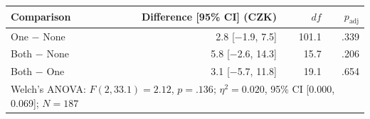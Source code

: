 \begin{tabular}{lrrr}
\toprule
Comparison & Difference [95\% CI] (CZK) & $df$ & $p_{\text{adj}}$ \\
\midrule
One $-$ None & 2.8 [\ensuremath{-}1.9, 7.5] & 101.1 & .339 \\
Both $-$ None & 5.8 [\ensuremath{-}2.6, 14.3] & 15.7 & .206 \\
Both $-$ One & 3.1 [\ensuremath{-}5.7, 11.8] & 19.1 & .654 \\
\midrule
\multicolumn{4}{l}{Welch's ANOVA: $F(2, 33.1) = 2.12$, $p = .136$; $\eta^2 = 0.020$, 95\% CI [0.000, 0.069]; $N = 187$} \\
\bottomrule
\end{tabular}
